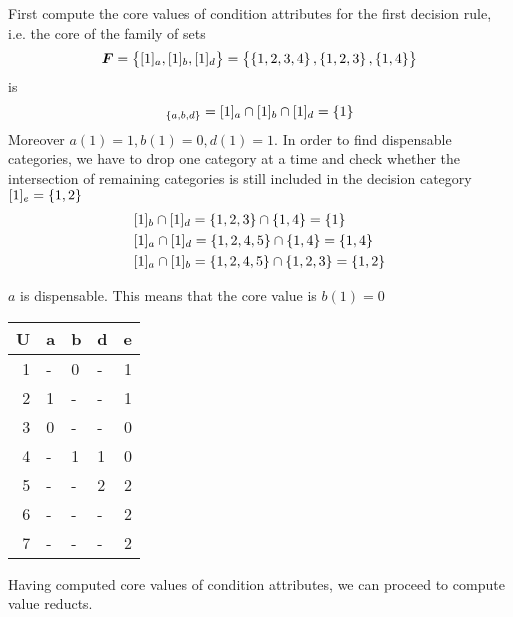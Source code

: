 \documentclass[11pt]{article}
\begin{document}
First compute the core values of condition attributes for the first decision
rule, i.e. the core of the family of sets
\begin{equation*}
\boldsymbol{F}=\left\{[1]_a,[1]_b,[1]_d\right\}=\left\{\left\{ 1,2,3,4\right\},\left\{ 1,2,3\right\},\left\{ 1,4\right\}\right\}
\end{equation*}
is 
\begin{equation*}
[1]_{\lb a,b,d\rb}=[1]_a\cap [1]_b\cap[1]_d=\lb 1\rb
\end{equation*}
Moreover \(a(1)=1,b(1)=0,d(1)=1\). In order to find dispensable categories, we
have to drop one category at a time and check whether the intersection of
remaining categories is still included in the decision category \([1]_e=\left\{
   1,2\right\}\)
\begin{align*}
  &[1]_b\cap[1]_d=\left\{ 1,2,3\right\}\cap\left\{ 1,4\right\}=\left\{ 1\right\}\\
  &[1]_a\cap[1]_d=\left\{ 1,2,4,5\right\}\cap\left\{ 1,4\right\}=\left\{ 1,4\right\}\\
  &[1]_a\cap[1]_b=\left\{ 1,2,4,5\right\}\cap\left\{ 1,2,3\right\}=\left\{ 1,2\right\}\\
\end{align*}

\(a\) is dispensable. This means that the core value is \(b(1)=0\)

\begin{center}
\begin{tabular}{rlllr}
U & a & b & d & e\\
\hline
1 & - & 0 & - & 1\\
2 & 1 & - & - & 1\\
3 & 0 & - & - & 0\\
4 & - & 1 & 1 & 0\\
5 & - & - & 2 & 2\\
6 & - & - & - & 2\\
7 & - & - & - & 2\\
\end{tabular}
\end{center}

Having computed core values of condition attributes, we can proceed to
compute value reducts. 
\end{document}
